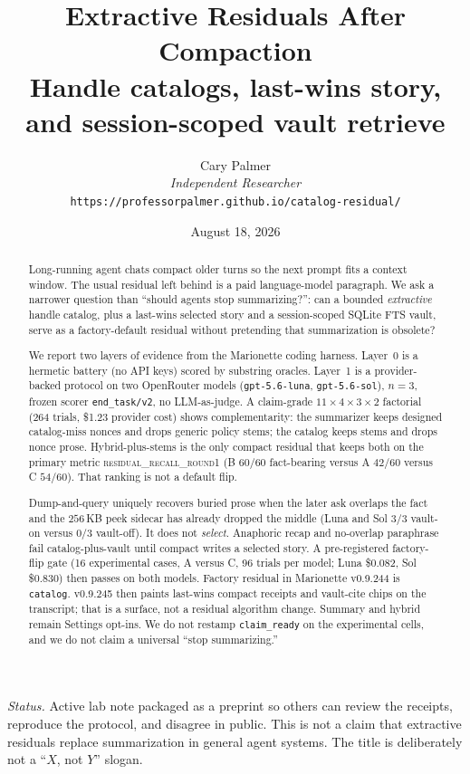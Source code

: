 \documentclass[11pt]{article}
\title{\textbf{Extractive Residuals After Compaction}\\[0.35em]
\large Handle catalogs, last-wins story,\\
and session-scoped vault retrieve}
\author{Cary Palmer\\
\textit{Independent Researcher}\\
\texttt{https://professorpalmer.github.io/catalog-residual/}}
\date{August 18, 2026}
\newcommand{\arm}[1]{\textsf{#1}}
\newcommand{\mode}[1]{\texttt{#1}}
\newcommand{\metric}[1]{\textsc{#1}}
\begin{document}
\maketitle

\begin{abstract}
Long-running agent chats compact older turns so the next prompt fits a
context window. The usual residual left behind is a paid language-model
paragraph. We ask a narrower question than ``should agents stop
summarizing?'': can a bounded \emph{extractive} handle catalog, plus a
last-wins selected story and a session-scoped SQLite FTS vault, serve as
a factory-default residual without pretending that summarization is
obsolete?

We report two layers of evidence from the Marionette coding harness.
Layer~0 is a hermetic battery (no API keys) scored by substring oracles.
Layer~1 is a provider-backed protocol on two OpenRouter models
(\texttt{gpt-5.6-luna}, \texttt{gpt-5.6-sol}), $n{=}3$, frozen scorer
\texttt{end\_task/v2}, no LLM-as-judge. A claim-grade
$11{\times}4{\times}3{\times}2$ factorial (264 trials, \$1.23 provider
cost) shows complementarity: the summarizer keeps designed catalog-miss
nonces and drops generic policy stems; the catalog keeps stems and drops
nonce prose. Hybrid-plus-stems is the only compact residual that keeps
both on the primary metric \metric{residual\_recall\_round1}
(\arm{B} $60/60$ fact-bearing versus \arm{A} $42/60$ versus \arm{C}
$54/60$). That ranking is not a default flip.

Dump-and-query uniquely recovers buried prose when the later ask overlaps
the fact and the $256$\,KB peek sidecar has already dropped the middle
(Luna and Sol $3/3$ vault-on versus $0/3$ vault-off). It does not
\emph{select}. Anaphoric recap and no-overlap paraphrase fail
catalog-plus-vault until compact writes a selected story. A
pre-registered factory-flip gate (16 experimental cases, \arm{A}
versus \arm{C}, 96 trials per model; Luna \$0.082, Sol \$0.830) then
passes on both models. Factory residual in Marionette v0.9.244 is
\mode{catalog}. v0.9.245 then paints last-wins compact receipts and
vault-cite chips on the transcript; that is a surface, not a residual
algorithm change. Summary and hybrid remain Settings opt-ins. We do not
restamp \texttt{claim\_ready} on the experimental cells, and we do not
claim a universal ``stop summarizing.''
\end{abstract}

\noindent\textit{Status.} Active lab note packaged as a preprint so others
can review the receipts, reproduce the protocol, and disagree in public.
This is not a claim that extractive residuals replace summarization in
general agent systems. The title is deliberately not a ``$X$, not $Y$''
slogan.
\end{document}
